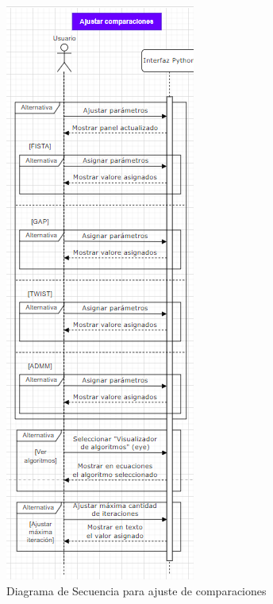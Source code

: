 \documentclass[12pt,twoside,letter]{ol-softwaremanual}
\begin{document}
\begin{figure}
	\centering
	\includegraphics[width=0.4\linewidth]{figures/screenshot004}
	\caption{Diagrama de Secuencia para ajuste de comparaciones}
	\label{fig:screenshot004}
\end{figure}
\end{document}
